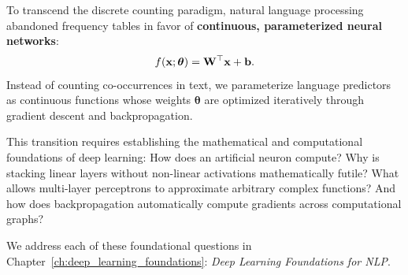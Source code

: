 \documentclass[../../main.tex]{subfiles}
\begin{document}
To transcend the discrete counting paradigm, natural language processing abandoned frequency tables in favor of \textbf{continuous, parameterized neural networks}:
\[
f(\mathbf{x}; \bm{\theta}) = \mathbf{W}^\top \mathbf{x} + \mathbf{b}.
\]
Instead of counting co-occurrences in text, we parameterize language predictors as continuous functions whose weights $\bm{\theta}$ are optimized iteratively through gradient descent and backpropagation. 

This transition requires establishing the mathematical and computational foundations of deep learning: How does an artificial neuron compute? Why is stacking linear layers without non-linear activations mathematically futile? What allows multi-layer perceptrons to approximate arbitrary complex functions? And how does backpropagation automatically compute gradients across computational graphs?

We address each of these foundational questions in Chapter~\ref{ch:deep_learning_foundations}: \emph{Deep Learning Foundations for NLP}.

\clearpage
\thispagestyle{empty}
\null
\clearpage
\end{document}
